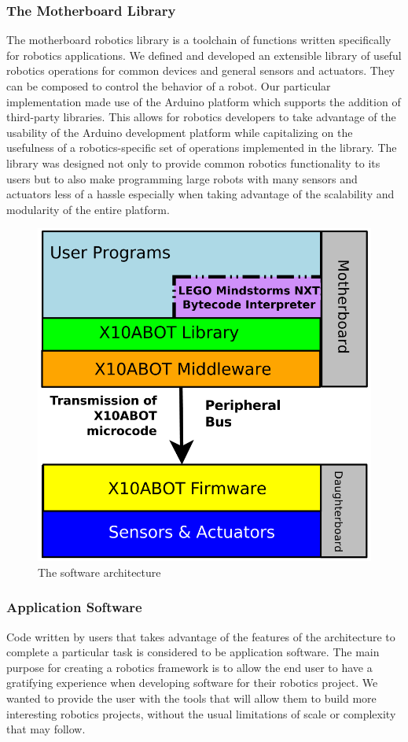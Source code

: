 	\subsubsection{The Motherboard Library} %
	\label{ssub:the_motherboard_library}

	
	The motherboard robotics library is a toolchain of functions written specifically for robotics applications. We defined and developed an extensible library of useful robotics operations for common devices and general sensors and actuators. They can be composed to control the behavior of a robot. Our particular implementation made use of the Arduino platform which supports the addition of third-party libraries. This allows for robotics developers to take advantage of the usability of the Arduino development platform while capitalizing on the usefulness of a robotics-specific set of operations implemented in the library.
The library was designed not only to provide common robotics functionality to its users but to also make programming large robots with many sensors and actuators less of a hassle especially when taking advantage of the scalability and modularity of the entire platform.

	\begin{figure}[h]
	  \begin{center}
	    \includegraphics[width=0.7\columnwidth]{Figures/system.pdf}
	    \caption{The \xten software architecture}
	  \end{center}
	\end{figure}
	
	


	\subsubsection{Application Software} %
	\label{ssub:application_software}
	Code written by users that takes advantage of the features of the \xten architecture to complete a particular task is considered to be application software. The main purpose for creating a robotics framework is to allow the end user to have a gratifying experience when developing software for their robotics project. We wanted to provide the user with the tools that will allow them to build more interesting robotics projects, without the usual limitations of scale or complexity that may follow. 
	
